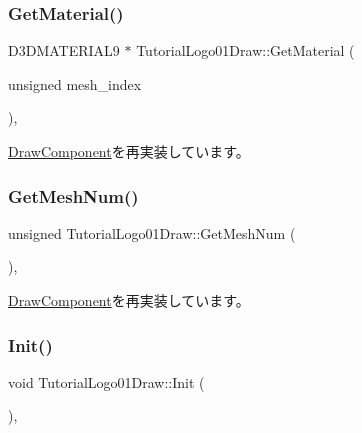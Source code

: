 \subsubsection{\texorpdfstring{Get\+Material()}{GetMaterial()}}
{\footnotesize\ttfamily D3\+D\+M\+A\+T\+E\+R\+I\+A\+L9 $\ast$ Tutorial\+Logo01\+Draw\+::\+Get\+Material (\begin{DoxyParamCaption}\item[{unsigned}]{mesh\+\_\+index }\end{DoxyParamCaption})\hspace{0.3cm}{\ttfamily [override]}, {\ttfamily [virtual]}}



\mbox{\hyperlink{class_draw_component_adae078d5139f691997763bf6cac9e25a}{Draw\+Component}}を再実装しています。

\mbox{\label{class_tutorial_logo01_draw_a08c17ba99169d9e8e57f9bc23d96c21c}} 
\subsubsection{\texorpdfstring{Get\+Mesh\+Num()}{GetMeshNum()}}
{\footnotesize\ttfamily unsigned Tutorial\+Logo01\+Draw\+::\+Get\+Mesh\+Num (\begin{DoxyParamCaption}{ }\end{DoxyParamCaption})\hspace{0.3cm}{\ttfamily [override]}, {\ttfamily [virtual]}}



\mbox{\hyperlink{class_draw_component_a5f3bbcc8e563b740c0a5535170921c75}{Draw\+Component}}を再実装しています。

\mbox{\label{class_tutorial_logo01_draw_a4ef239c2fcd12ddd8a0a9256bedacdcb}} 
\subsubsection{\texorpdfstring{Init()}{Init()}}
{\footnotesize\ttfamily void Tutorial\+Logo01\+Draw\+::\+Init (\begin{DoxyParamCaption}{ }\end{DoxyParamCaption})\hspace{0.3cm}{\ttfamily [override]}, {\ttfamily [virtual]}}



